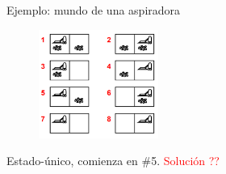 \documentclass{beamer}
\theoremstyle{definition}
\theoremstyle{theorem}
\theoremstyle{remark}
\begin{document}

\begin{frame}{Ejemplo: mundo de una aspiradora}
    \begin{figure} %
        \centering
        \includegraphics[width=0.35\textwidth]{8_image_example1.PNG}
    \end{figure}
    
    Estado-único, comienza en \#5. \textcolor{red}{Solución ??}
\end{frame}

\end{document}
